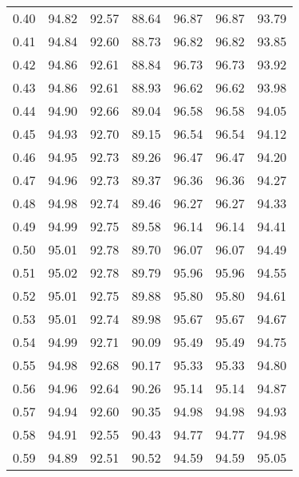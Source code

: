 \begin{tabular}{|c|c|c|c|c|c|c|}
      0.40 &     94.82 &     92.57 &      88.64 &   96.87 &      96.87 &         93.79 \\
      0.41 &     94.84 &     92.60 &      88.73 &   96.82 &      96.82 &         93.85 \\
      0.42 &     94.86 &     92.61 &      88.84 &   96.73 &      96.73 &         93.92 \\
      0.43 &     94.86 &     92.61 &      88.93 &   96.62 &      96.62 &         93.98 \\
      0.44 &     94.90 &     92.66 &      89.04 &   96.58 &      96.58 &         94.05 \\
      0.45 &     94.93 &     92.70 &      89.15 &   96.54 &      96.54 &         94.12 \\
      0.46 &     94.95 &     92.73 &      89.26 &   96.47 &      96.47 &         94.20 \\
      0.47 &     94.96 &     92.73 &      89.37 &   96.36 &      96.36 &         94.27 \\
      0.48 &     94.98 &     92.74 &      89.46 &   96.27 &      96.27 &         94.33 \\
      0.49 &     94.99 &     92.75 &      89.58 &   96.14 &      96.14 &         94.41 \\
      0.50 &     95.01 &     92.78 &      89.70 &   96.07 &      96.07 &         94.49 \\
      0.51 &     95.02 &     92.78 &      89.79 &   95.96 &      95.96 &         94.55 \\
      0.52 &     95.01 &     92.75 &      89.88 &   95.80 &      95.80 &         94.61 \\
      0.53 &     95.01 &     92.74 &      89.98 &   95.67 &      95.67 &         94.67 \\
      0.54 &     94.99 &     92.71 &      90.09 &   95.49 &      95.49 &         94.75 \\
      0.55 &     94.98 &     92.68 &      90.17 &   95.33 &      95.33 &         94.80 \\
      0.56 &     94.96 &     92.64 &      90.26 &   95.14 &      95.14 &         94.87 \\
      0.57 &     94.94 &     92.60 &      90.35 &   94.98 &      94.98 &         94.93 \\
      0.58 &     94.91 &     92.55 &      90.43 &   94.77 &      94.77 &         94.98 \\
      0.59 &     94.89 &     92.51 &      90.52 &   94.59 &      94.59 &         95.05 \\

\end{tabular}
